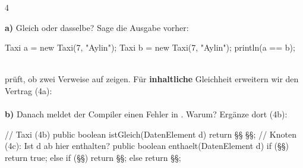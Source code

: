 \documentclass[11pt,a4paper]{article}
\begin{document}
\begin{aufgabe}{4}
\begin{minipage}[t]{0.47\linewidth}
\vspace{0pt}\raggedright
\textbf{a)} Gleich oder dasselbe? Sage die Ausgabe vorher:\\[-0.5mm]
\begin{java}[basicstyle=\ttfamily\scriptsize]
Taxi a = new Taxi(7, "Aylin");
Taxi b = new Taxi(7, "Aylin");
println(a == b);
\end{java}
\\[1mm]
\code{==} prüft, ob zwei Verweise auf  zeigen. Für \textbf{inhaltliche} Gleichheit erweitern wir den Vertrag  (4a):\\[1mm]
 \code{;}\\[1mm]
\textbf{b)} Danach meldet der Compiler einen Fehler in . Warum? Ergänze dort (4b):
\end{minipage}\hfill
\begin{minipage}[t]{0.5\linewidth}
\vspace{0pt}
\begin{java}[basicstyle=\ttfamily\scriptsize]
// Taxi (4b)
public boolean istGleich(DatenElement d) {
   return §§
          §§;
}
// Knoten (4c): Ist d ab hier enthalten?
public boolean enthaelt(DatenElement d) {
   if (§§) {
      return true;
   } else if (§§) {
      return §§;
   } else {
      return §§;
   }
}
\end{java}
\end{minipage}
\end{aufgabe}
\end{document}
